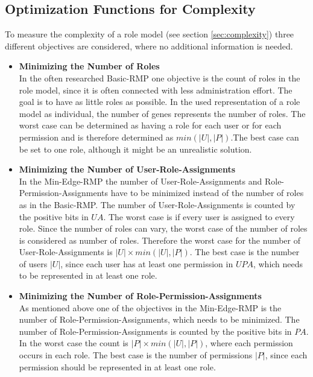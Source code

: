         \subsection{Optimization Functions for Complexity}
        \label{sec:optimizationComplexity}
        To measure the complexity of a role model (see section \ref{sec:complexity}) three different objectives are considered, where no additional information is needed.
        \begin{itemize}
            \item \textbf{Minimizing the Number of Roles}\\
            In the often researched Basic-RMP one objective is the count of roles in the role model, since it is often connected with less administration effort. The goal is to have as little roles as possible. In the used representation of a role model as individual, the number of genes represents the number of roles. The worst case can be determined as having a role for each user or for each permission and is therefore determined as $min(|U|,|P|)$.The best case can be set to one role, although it might be an unrealistic solution.
            \item \textbf{Minimizing the Number of User-Role-Assignments}\\
            In the Min-Edge-RMP the number of User-Role-Assignments and Role-Permission-Assignments have to be minimized instead of the number of roles as in the Basic-RMP. The number of User-Role-Assignments is counted by the positive bits in $UA$. The worst case is if every user is assigned to every role. Since the number of roles can vary, the worst case of the number of roles is considered as number of roles. Therefore the worst case for the number of User-Role-Assignments is $|U| \times min(|U|,|P|)$. The best case is the number of users $|U|$, since each user has at least one permission in $UPA$, which needs to be represented in at least one role.
            \item \textbf{Minimizing the Number of Role-Permission-Assignments}\\
            As mentioned above one of the objectives in the Min-Edge-RMP is the number of Role-Permission-Assignments, which needs to be minimized. The number of Role-Permission-Assignments is counted by the positive bits in $PA$. In the worst case the count is $|P| \times min(|U|,|P|)$, where each permission occurs in each role. The best case is the number of permissions $|P|$, since each permission should be represented in at least one role.
        \end{itemize}
